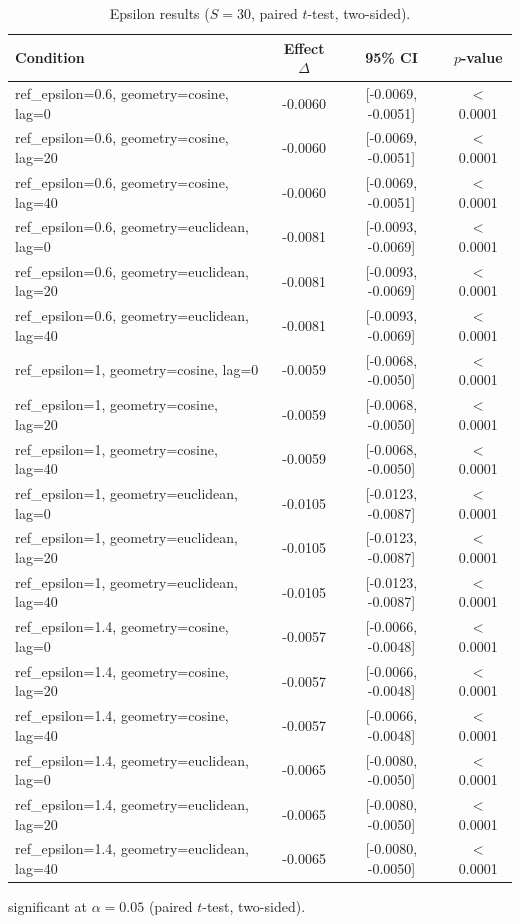 \begin{table}[t]
  \centering
  \caption{Epsilon results ($S=30$, paired $t$-test, two-sided).}
  \label{tab:epsilon}
  \begin{tabular}{lccc}
    \toprule
    Condition & Effect $\Delta$ & 95\% CI & $p$-value \\
    \midrule
    ref_epsilon=0.6, geometry=cosine, lag=0 & -0.0060\dag{} & [-0.0069, -0.0051] & $<$0.0001 \\
    ref_epsilon=0.6, geometry=cosine, lag=20 & -0.0060\dag{} & [-0.0069, -0.0051] & $<$0.0001 \\
    ref_epsilon=0.6, geometry=cosine, lag=40 & -0.0060\dag{} & [-0.0069, -0.0051] & $<$0.0001 \\
    ref_epsilon=0.6, geometry=euclidean, lag=0 & -0.0081\dag{} & [-0.0093, -0.0069] & $<$0.0001 \\
    ref_epsilon=0.6, geometry=euclidean, lag=20 & -0.0081\dag{} & [-0.0093, -0.0069] & $<$0.0001 \\
    ref_epsilon=0.6, geometry=euclidean, lag=40 & -0.0081\dag{} & [-0.0093, -0.0069] & $<$0.0001 \\
    ref_epsilon=1, geometry=cosine, lag=0 & -0.0059\dag{} & [-0.0068, -0.0050] & $<$0.0001 \\
    ref_epsilon=1, geometry=cosine, lag=20 & -0.0059\dag{} & [-0.0068, -0.0050] & $<$0.0001 \\
    ref_epsilon=1, geometry=cosine, lag=40 & -0.0059\dag{} & [-0.0068, -0.0050] & $<$0.0001 \\
    ref_epsilon=1, geometry=euclidean, lag=0 & -0.0105\dag{} & [-0.0123, -0.0087] & $<$0.0001 \\
    ref_epsilon=1, geometry=euclidean, lag=20 & -0.0105\dag{} & [-0.0123, -0.0087] & $<$0.0001 \\
    ref_epsilon=1, geometry=euclidean, lag=40 & -0.0105\dag{} & [-0.0123, -0.0087] & $<$0.0001 \\
    ref_epsilon=1.4, geometry=cosine, lag=0 & -0.0057\dag{} & [-0.0066, -0.0048] & $<$0.0001 \\
    ref_epsilon=1.4, geometry=cosine, lag=20 & -0.0057\dag{} & [-0.0066, -0.0048] & $<$0.0001 \\
    ref_epsilon=1.4, geometry=cosine, lag=40 & -0.0057\dag{} & [-0.0066, -0.0048] & $<$0.0001 \\
    ref_epsilon=1.4, geometry=euclidean, lag=0 & -0.0065\dag{} & [-0.0080, -0.0050] & $<$0.0001 \\
    ref_epsilon=1.4, geometry=euclidean, lag=20 & -0.0065\dag{} & [-0.0080, -0.0050] & $<$0.0001 \\
    ref_epsilon=1.4, geometry=euclidean, lag=40 & -0.0065\dag{} & [-0.0080, -0.0050] & $<$0.0001 \\
    \bottomrule
  \end{tabular}
  \begin{minipage}{\linewidth}
    \vspace{4pt}
    \footnotesize \dag{} significant at $\alpha = 0.05$ (paired $t$-test, two-sided).
  \end{minipage}
\end{table}